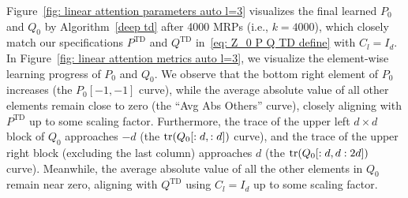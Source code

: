 \documentclass{article}
\newcommand{\td}{\text{TD}}
\begin{document}
Figure~\ref{fig: linear attention parameters auto l=3} visualizes the final 
learned $P_0$ and $Q_0$ by Algorithm~\ref{deep td} after 4000 MRPs (i.e., $k=4000$),
which
closely match our specifications $P^{\td}$ and $Q^{\td}$ in~\eqref{eq: Z_0 P Q TD define} with $C_l = I_d$.
In Figure~\ref{fig: linear attention metrics auto l=3}, 
we visualize the element-wise learning progress of $P_0$ and $Q_0$.
We observe that the bottom right element of $P_0$ increases (the $P_0[-1, -1]$ curve),
while the average absolute value of all other elements remain close to zero (the ``Avg Abs Others'' curve),
closely aligning with $P^{\td}$ up to some scaling factor. 
Furthermore, the trace of the upper left $d \times d$ block of $Q_0$ approaches $-d$ (the $\tr(Q_0[:d,:d])$ curve), 
and the trace of the upper right block (excluding the last column) approaches $d$ (the $\tr(Q_0[:d, d:2d])$ curve). 
Meanwhile, the average absolute value of all the other elements in $Q_0$ remain near zero, 
aligning with $Q^\td$ using $C_l = I_d$ up to some scaling factor.
\end{document}
